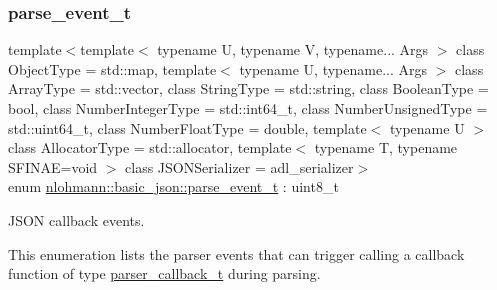 \subsubsection{\texorpdfstring{parse\_event\_t}{parse\_event\_t}}
{\footnotesize\ttfamily template$<$template$<$ typename U, typename V, typename... Args $>$ class Object\+Type = std\+::map, template$<$ typename U, typename... Args $>$ class Array\+Type = std\+::vector, class String\+Type  = std\+::string, class Boolean\+Type  = bool, class Number\+Integer\+Type  = std\+::int64\+\_\+t, class Number\+Unsigned\+Type  = std\+::uint64\+\_\+t, class Number\+Float\+Type  = double, template$<$ typename U $>$ class Allocator\+Type = std\+::allocator, template$<$ typename T, typename S\+F\+I\+N\+A\+E=void $>$ class J\+S\+O\+N\+Serializer = adl\+\_\+serializer$>$ \\
enum \mbox{\hyperlink{classnlohmann_1_1basic__json_aea1c863b719b4ca5b77188c171bbfafe}{nlohmann\+::basic\+\_\+json\+::parse\+\_\+event\+\_\+t}} \+: uint8\+\_\+t\hspace{0.3cm}{\ttfamily [strong]}}



J\+S\+ON callback events. 

This enumeration lists the parser events that can trigger calling a callback function of type \mbox{\hyperlink{classnlohmann_1_1basic__json_aecae491e175f8767c550ae3c59e180e3}{parser\+\_\+callback\+\_\+t}} during parsing.


